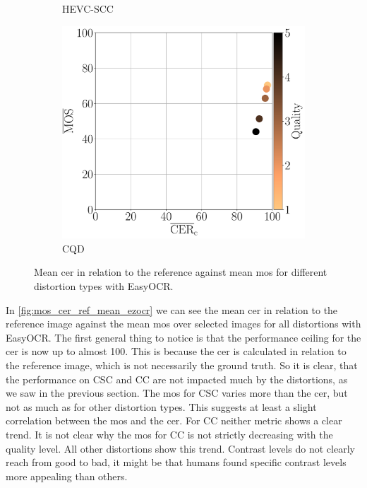 \begin{figure}[h]
\begin{subfigure}[b]{0.3\textwidth}
        \caption{HEVC-SCC}
        \label{fig:mos_cer_ref_mean_ezocr_HEVC-SCC}
    \end{subfigure}
    \hfill
    \begin{subfigure}[b]{0.3\textwidth}
        \includegraphics[width=\textwidth]{../../images/analyze/mos_cer_ref_mean_ezocr_CQD.pdf}
        \caption{CQD}
        \label{fig:mos_cer_ref_mean_ezocr_CQD}
    \end{subfigure}
\caption{Mean \gls{cer} in relation to the reference against mean \gls{mos} for different distortion types with EasyOCR.}
\label{fig:mos_cer_ref_mean_ezocr}
\end{figure}

In \autoref{fig:mos_cer_ref_mean_ezocr} we can see the mean \gls{cer} in relation to the reference image against the mean \gls{mos} over selected images for all distortions with EasyOCR.
The first general thing to notice is that the performance ceiling for the \gls{cer} is now up to almost 100.
This is because the \gls{cer} is calculated in relation to the reference image, which is not necessarily the ground truth.
So it is clear, that the performance on CSC and CC are not impacted much by the distortions, as we saw in the previous section.
The \gls{mos} for CSC varies more than the \gls{cer}, but not as much as for other distortion types.
This suggests at least a slight correlation between the \gls{mos} and the \gls{cer}.
For CC neither metric shows a clear trend.
It is not clear why the \gls{mos} for CC is not strictly decreasing with the quality level.
All other distortions show this trend.
Contrast levels do not clearly reach from good to bad, it might be that humans found specific contrast levels more appealing than others.

